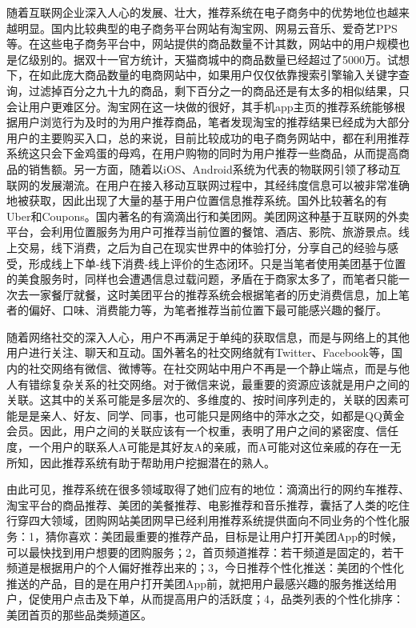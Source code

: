 	随着互联网企业深入人心的发展、壮大，推荐系统在电子商务中的优势地位也越来越明显。国内比较典型的电子商务平台网站有淘宝网、网易云音乐、爱奇艺PPS等。在这些电子商务平台中，网站提供的商品数量不计其数，网站中的用户规模也是亿级别的。据双十一官方统计，天猫商城中的商品数量已经超过了5000万。试想下，在如此庞大商品数量的电商网站中，如果用户仅仅依靠搜索引擎输入关键字查询，过滤掉百分之九十九的商品，剩下百分之一的商品还是有太多的相似结果，只会让用户更难区分。淘宝网在这一块做的很好，其手机app主页的推荐系统能够根据用户浏览行为\citep{user-interest}及时的为用户推荐商品，笔者发现淘宝的推荐结果已经成为大部分用户的主要购买入口，总的来说，目前比较成功的电子商务网站中，都在利用推荐系统这只会下金鸡蛋的母鸡，在用户购物的同时为用户推荐一些商品，从而提高商品的销售额。另一方面，随着以iOS、Android系统为代表的物联网引领了移动互联网的发展潮流。在用户在接入移动互联网过程中，其经纬度信息可以被非常准确地被获取，因此出现了大量的基于用户位置信息推荐系统。国外比较著名的有Uber和Coupons。国内著名的有滴滴出行和美团网。美团网这种基于互联网的外卖平台，会利用位置服务为用户可推荐当前位置的餐馆、酒店、影院、旅游景点。线上交易，线下消费，之后为自己在现实世界中的体验打分，分享自己的经验与感受，形成线上下单-线下消费-线上评价的生态闭环。只是当笔者使用美团基于位置的美食服务时，同样也会遭遇信息过载问题，矛盾在于商家太多了，而笔者只能一次去一家餐厅就餐，这时美团平台的推荐系统会根据笔者的历史消费信息，加上笔者的偏好、口味、消费能力等，为笔者推荐当前位置下最可能感兴趣的餐厅。

	随着网络社交的深入人心，用户不再满足于单纯的获取信息，而是与网络上的其他用户进行关注、聊天和互动。国外著名的社交网络就有Twitter、Facebook等，国内的社交网络有微信、微博等。在社交网站中用户不再是一个静止端点，而是与他人有错综复杂关系的社交网络。对于微信来说，最重要的资源应该就是用户之间的关联。这其中的关系可能是多层次的、多维度的、按时间序列走的，关联的因素可能是是亲人、好友、同学、同事，也可能只是网络中的萍水之交，如都是QQ黄金会员。因此，用户之间的关联应该有一个权重，表明了用户之间的紧密度、信任度，一个用户的联系人A可能是其好友A的亲戚，而A可能对这位亲戚的存在一无所知，因此推荐系统有助于帮助用户挖掘潜在的熟人。

	由此可见，推荐系统在很多领域取得了她们应有的地位：滴滴出行的网约车推荐、淘宝平台的商品推荐、美团的美餐推荐、电影推荐和音乐推荐，囊括了人类的吃住行穿四大领域，团购网站美团网早已经利用推荐系统提供面向不同业务的个性化服务：1，猜你喜欢：美团最重要的推荐产品，目标是让用户打开美团App的时候，可以最快找到用户想要的团购服务；2，首页频道推荐：若干频道是固定的，若干频道是根据用户的个人偏好推荐出来的；3，今日推荐个性化推送：美团的个性化推送的产品，目的是在用户打开美团App前，就把用户最感兴趣的服务推送给用户，促使用户点击及下单，从而提高用户的活跃度；4，品类列表的个性化排序：美团首页的那些品类频道区。

